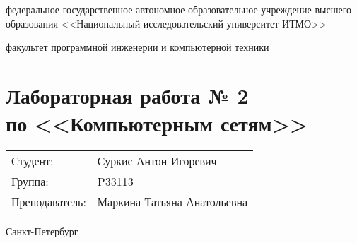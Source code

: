 \begin{titlepage}
    \begin{center}
        федеральное государственное автономное образовательное учреждение высшего образования
        <<Национальный исследовательский университет ИТМО>>

        \bigskip

        факультет программной инженерии и компьютерной техники

        \vfill

        \section*{Лабораторная работа № 2 \\
        по <<Компьютерным сетям>>}

        \bigskip

        \begin{flushright}
            \begin{tabular}{ll}
                Студент: & Суркис Антон Игоревич \\
                Группа: & P33113 \\
                Преподаватель: & Маркина Татьяна Анатольевна \\
            \end{tabular}
        \end{flushright}

        \vfill

        Санкт-Петербург

        \the\year
    \end{center}
\end{titlepage}
